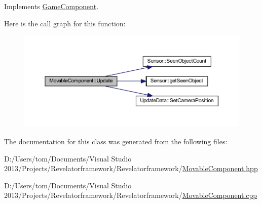 Implements \hyperlink{class_game_component_a01b3434d7bf6a63552e7ea4fd68744fe}{Game\-Component}.



Here is the call graph for this function\-:\nopagebreak
\begin{figure}[H]
\begin{center}
\leavevmode
\includegraphics[width=350pt]{class_movable_component_a6310c2306c503472873721a9756003a8_cgraph}
\end{center}
\end{figure}




The documentation for this class was generated from the following files\-:\begin{DoxyCompactItemize}
\item 
D\-:/\-Users/tom/\-Documents/\-Visual Studio 2013/\-Projects/\-Revelatorframework/\-Revelatorframework/\hyperlink{_movable_component_8hpp}{Movable\-Component.\-hpp}\item 
D\-:/\-Users/tom/\-Documents/\-Visual Studio 2013/\-Projects/\-Revelatorframework/\-Revelatorframework/\hyperlink{_movable_component_8cpp}{Movable\-Component.\-cpp}\end{DoxyCompactItemize}

